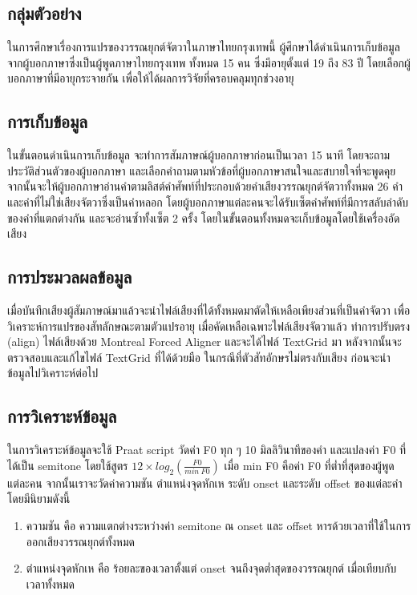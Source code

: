\documentclass[a4paper]{article}
\begin{document}
\subsection{กลุ่มตัวอย่าง}
    ในการศึกษาเรื่องการแปรของวรรณยุกต์จัตวาในภาษาไทยกรุงเทพนี้ ผู้ศึกษาได้ดำเนินการเก็บข้อมูลจากผู้บอกภาษาซึ่งเป็นผู้พูดภาษาไทยกรุงเทพ ทั้งหมด 15 คน ซึ่งมีอายุตั้งแต่ 19 ถึง 83 ปี โดยเลือกผู้บอกภาษาที่มีอายุกระจายกัน เพื่อให้ได้ผลการวิจัยที่ครอบคลุมทุกช่วงอายุ
\subsection{การเก็บข้อมูล}
    ในขั้นตอนดำเนินการเก็บข้อมูล จะทำการสัมภาษณ์ผู้บอกภาษาก่อนเป็นเวลา 15 นาที โดยจะถามประวัติส่วนตัวของผู้บอกภาษา และเลือกคำถามตามหัวข้อที่ผู้บอกภาษาสนใจและสบายใจที่จะพูดคุย จากนั้นจะให้ผู้บอกภาษาอ่านคำตามลิสต์คำศัพท์ที่ประกอบด้วยคำเสียงวรรณยุกต์จัตวาทั้งหมด 26 คำ และคำที่ไม่ใช่เสียงจัตวาซึ่งเป็นคำหลอก โดยผู้บอกภาษาแต่ละคนจะได้รับเซ็ตคำศัพท์ที่มีการสลับลำดับของคำที่แตกต่างกัน และจะอ่านซ้ำทั้งเซ็ต 2 ครั้ง โดยในขั้นตอนทั้งหมดจะเก็บข้อมูลโดยใช้เครื่องอัดเสียง
\subsection{การประมวลผลข้อมูล}
    เมื่อบันทึกเสียงผู้สัมภาษณ์มาแล้วจะนำไฟล์เสียงที่ได้ทั้งหมดมาตัดให้เหลือเพียงส่วนที่เป็นคำจัตวา เพื่อวิเคราะห์การแปรของสัทลักษณะตามตัวแปรอายุ เมื่อคัดเหลือเฉพาะไฟล์เสียงจัตวาแล้ว ทำการปรับตรง (align) ไฟล์เสียงด้วย Montreal Forced Aligner และจะได้ไฟล์ TextGrid มา หลังจากนั้นจะตรวจสอบและแก้ไขไฟล์ TextGrid ที่ได้ด้วยมือ ในกรณีที่ตัวสัทอักษรไม่ตรงกับเสียง ก่อนจะนำข้อมูลไปวิเคราะห์ต่อไป
\subsection{การวิเคราะห์ข้อมูล}
    ในการวิเคราะห์ข้อมูลจะใช้ Praat script วัดค่า F0 ทุก ๆ 10 มิลลิวินาทีของคำ และแปลงค่า F0 ที่ได้เป็น semitone โดยใช้สูตร $12 \times log_2(\frac{F0}{min\ F0})$ เมื่อ min F0 คือค่า F0 ที่ต่ำที่สุดของผู้พูดแต่ละคน จากนั้นเราจะวัดค่าความชัน ตำแหน่งจุดหักเห ระดับ onset และระดับ offset ของแต่ละคำ โดยมีนิยามดังนี้
    \begin{enumerate}
        \item ความชัน คือ ความแตกต่างระหว่างค่า semitone ณ onset และ offset หารด้วยเวลาที่ใช้ในการออกเสียงวรรณยุกต์ทั้งหมด
        \item ตำแหน่งจุดหักเห คือ ร้อยละของเวลาตั้งแต่ onset จนถึงจุดต่ำสุดของวรรณยุกต์ เมื่อเทียบกับเวลาทั้งหมด
    \end{enumerate}
\end{document}
